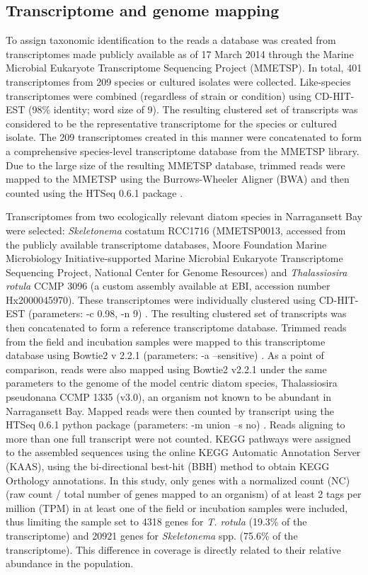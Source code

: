 \subsection{Transcriptome and genome mapping}
To assign taxonomic identification to the reads a database was created from transcriptomes made publicly available as of 17 March 2014 through the Marine Microbial Eukaryote Transcriptome Sequencing Project (MMETSP). In total, 401 transcriptomes from 209 species or cultured isolates were collected. Like-species transcriptomes were combined (regardless of strain or condition) using CD-HIT-EST (98\% identity; word size of 9). The resulting clustered set of transcripts was considered to be the representative transcriptome for the species or cultured isolate. The 209 transcriptomes created in this manner were concatenated to form a comprehensive species-level transcriptome database from the MMETSP library. Due to the large size of the resulting MMETSP database, trimmed reads were mapped to the MMETSP using the Burrows-Wheeler Aligner (BWA) \citep{Li2010} and then counted using the HTSeq 0.6.1 package \citep{Anders2014}.\par 
Transcriptomes from two ecologically relevant diatom species in Narragansett Bay were selected: \textit{Skeletonema} costatum RCC1716 (MMETSP0013, accessed from the publicly available transcriptome databases, Moore Foundation Marine Microbiology Initiative-supported Marine Microbial Eukaryote Transcriptome Sequencing Project, National Center for Genome Resources) and \textit{Thalassiosira rotula} CCMP 3096 (a custom assembly available at EBI, accession number Hx2000045970). These transcriptomes were individually clustered using CD-HIT-EST (parameters: -c 0.98, -n 9) \citep{Li2006}. The resulting clustered set of transcripts was then concatenated to form a reference transcriptome database. Trimmed reads from the field and incubation samples were mapped to this transcriptome database using Bowtie2 v 2.2.1 (parameters: -a –sensitive) \citep{Langmead2012}. As a point of comparison, reads were also mapped using Bowtie2 v2.2.1 under the same parameters to the genome of the model centric diatom species, Thalassiosira pseudonana CCMP 1335 (v3.0), an organism not known to be abundant in Narragansett Bay. Mapped reads were then counted by transcript using the HTSeq 0.6.1 python package (parameters: -m union –s no) \citep{Anders2014}. Reads aligning to more than one full transcript were not counted. KEGG pathways were assigned to the assembled sequences using the online KEGG Automatic Annotation Server (KAAS), using the bi-directional best-hit (BBH) method to obtain KEGG Orthology annotations. In this study, only genes with a normalized count (NC) (raw count / total number of genes mapped to an organism) of at least 2 tags per million (TPM) in at least one of the field or incubation samples were included, thus limiting the sample set to 4318 genes for \textit{T. rotula} (19.3\% of the transcriptome) and 20921 genes for \textit{Skeletonema} spp. (75.6\% of the transcriptome). This difference in coverage is directly related to their relative abundance in the population.
